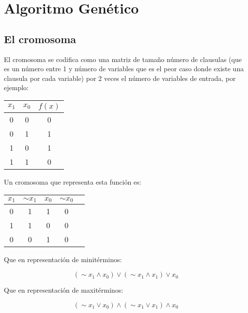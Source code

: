 \documentclass[a4paper]{article}
\begin{document}
\section{Algoritmo Genético}

\subsection{El cromosoma}

El cromosoma se codifica como una matriz de tamaño número de clausulas (que es un número entre 1 y número de variables que es el peor caso donde existe una clausula por cada variable) por 2 veces el número de variables de entrada, por ejemplo:

\begin{table}[H]
	\centering
	\begin{tabular}{|c | c | c|}
		\hline
		$x_1$ & $x_0$ & $f(x)$ \\
		\hline
		0 & 0& 0\\
		\hline
		0 & 1 & 1\\
		\hline
		1 & 0& 1\\
		\hline
		1 & 1 & 0\\
		\hline
	\end{tabular}
\end{table}

Un cromosoma que representa esta función es:

\begin{table}[H]
	\centering
	\begin{tabular}{|c | c | c|  c|  c|}
		\hline
		$x_1$ & $ \sim{x_1}$ & $x_0$ & $ \sim{x_0}$\\
		\hline
		0 & 1& 1 & 0\\
		\hline
		1 & 1& 0 & 0\\
		\hline
		0 & 0& 1 & 0\\
		\hline
	\end{tabular}
\end{table}

Que en representación de minitérminos:

\begin{equation}
	(\sim{x_1} \wedge x_0) \vee (\sim{x_1} \wedge x_1) \vee x_0
\end{equation}

Que en representación de maxitérminos:

\begin{equation}
	(\sim{x_1} \vee x_0) \wedge (\sim{x_1} \vee x_1) \wedge x_0
\end{equation}
\end{document}

